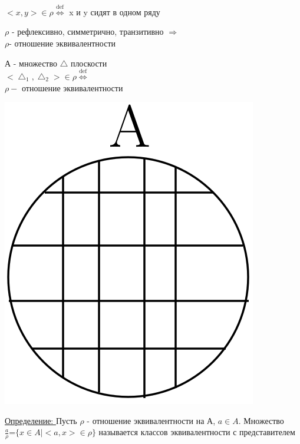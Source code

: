 \documentclass[12pt]{article}
\let\ORIincludegraphics\includegraphics
\renewcommand{\includegraphics}[2][]{\ORIincludegraphics[scale=0.65,#1]{#2}}
\begin{document}
\begin{enumerate}
\begin{minipage}{0.3\textwidth}
        \end{minipage}
        \hspace{1em}
        \begin{minipage}{0.7\textwidth}
            $<x,y> \in \rho \overset{\text{def}}{\Leftrightarrow}$ x и y сидят в одном ряду\\
            \par
        $\rho$ - рефлексивно, симметрично, транзитивно $\Rightarrow$\\$\rho$- отношение эквивалентности
        \end{minipage}
        \begin{minipage}{0.55\textwidth}
            \item А - множество $\bigtriangleup$ плоскости\\
            $<\bigtriangleup_1,\bigtriangleup_2> \in \rho \overset{\text{def}}{\Leftrightarrow}$\\
            $\rho - \text{ отношение эквивалентности }$\\
        \end{minipage}
        \begin{minipage}{0.45\textwidth}
            \includegraphics[scale=0.3]{1.2.png}
        \end{minipage}
        \hspace{1em}
        \vspace{1em}
        \par
    \end{enumerate}
    \underline{Определение: } Пусть $\rho$ - отношение эквивалентности на А, $a \in A$. Множество \\
    $\frac{a}{\rho}$=$\{x \in A | <a,x> \in \rho\}$ называется классов эквивалентности с представителем
\end{document}
